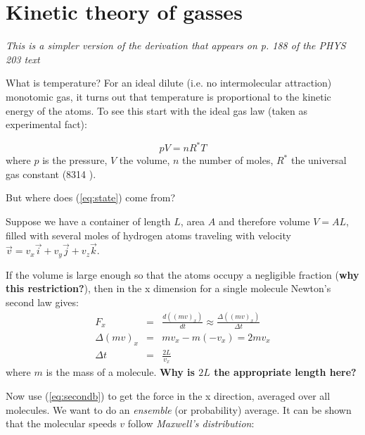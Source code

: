 \documentclass[12pt]{article}
\begin{document}
\newcommand{\vect}[1]{\boldsymbol{\vec{#1}}}
\pagestyle{first}


\section{Kinetic theory of gasses}

\textit{This is a simpler version of the derivation that appears on p. 188 of the PHYS 203 text}


What is temperature?  For an ideal dilute (i.e. no intermolecular attraction) 
 monotomic gas, it turns out that
temperature is proportional to the kinetic energy of the atoms.  To see this
start with  the ideal gas law (taken as experimental fact):

  \begin{equation}
    \label{eq:state}
    pV= nR^* T
  \end{equation}
where $p$ is the pressure, $V$ the volume, $n$ the number of moles, $R^*$ the
universal gas constant (8314 ).

But where does (\ref{eq:state}) come from?

Suppose we have a
container of length $L$, area $A$ and therefore volume $V=AL$, filled
with several moles of hydrogen atoms traveling with velocity
$\vec{v}=v_x \vec{i} + v_y \vec{j} + v_z \vec{k}$.

\par 

If the volume is large enough so that the atoms occupy a negligible fraction 
(\textbf{why this restriction?}), 
then
in the x dimension for a single molecule Newton's second law gives:
\begin{subequations}
  \label{eq:second}
\begin{eqnarray}
  F_x &=& \frac{d((mv)_x)}{dt} \approx \frac{\Delta((mv)_x)}{\Delta t}\label{eq:seconda}\\
  \Delta (mv)_x &=& mv_x - m(-v_x) = 2mv_x \label{eq:secondb}\\
\Delta t &=& \frac{2 L}{v_x}
\end{eqnarray}
\end{subequations}
where $m$ is the mass of a molecule. \textbf{Why is $2L$ the appropriate length here?}

Now use (\ref{eq:secondb})  to get the force in the x direction, averaged over all
molecules.  We want to do an \textit{ensemble} (or probability) average.
It can be shown that the molecular speeds $v$ follow
\textit{Maxwell's distribution}:
\end{document}
